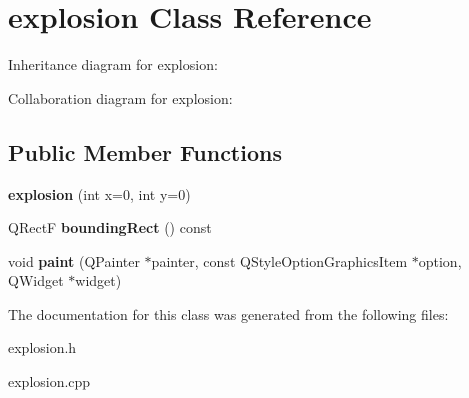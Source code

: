\hypertarget{classexplosion}{\section{explosion Class Reference}
\label{classexplosion}
}


Inheritance diagram for explosion\-:


Collaboration diagram for explosion\-:
\subsection*{Public Member Functions}
\begin{DoxyCompactItemize}
\item 
\hypertarget{classexplosion_ac3aabcbf16f356fcd3bdc8588cf36cf1}{{\bfseries explosion} (int x=0, int y=0)}\label{classexplosion_ac3aabcbf16f356fcd3bdc8588cf36cf1}

\item 
\hypertarget{classexplosion_adc8680178e9e7d4e388d8850a2c03125}{Q\-Rect\-F {\bfseries bounding\-Rect} () const }\label{classexplosion_adc8680178e9e7d4e388d8850a2c03125}

\item 
\hypertarget{classexplosion_a401d7dbebfc4a92bcc408172df67c782}{void {\bfseries paint} (Q\-Painter $\ast$painter, const Q\-Style\-Option\-Graphics\-Item $\ast$option, Q\-Widget $\ast$widget)}\label{classexplosion_a401d7dbebfc4a92bcc408172df67c782}

\end{DoxyCompactItemize}


The documentation for this class was generated from the following files\-:\begin{DoxyCompactItemize}
\item 
explosion.\-h\item 
explosion.\-cpp\end{DoxyCompactItemize}
